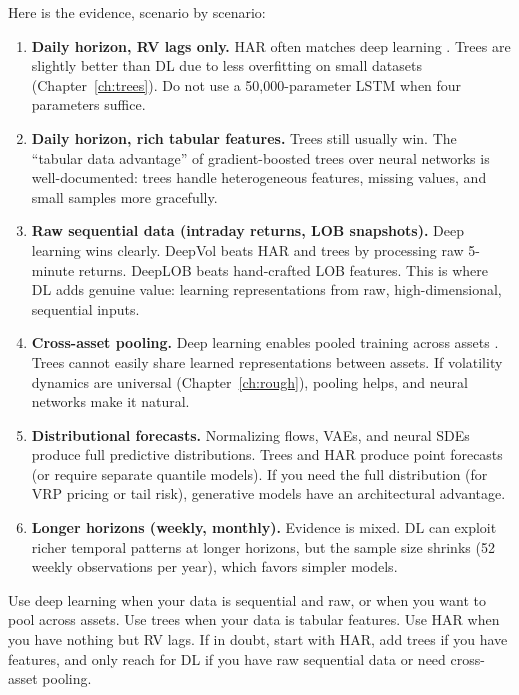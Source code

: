Here is the evidence, scenario by scenario:

\begin{enumerate}[nosep]
  \item \textbf{Daily horizon, RV lags only.}
    HAR often matches deep learning \citep{ChristensenSiggaardVeliyev2023}.
    Trees are slightly better than DL due to less overfitting on small datasets (Chapter~\ref{ch:trees}).
    Do not use a 50,000-parameter LSTM when four parameters suffice.

  \item \textbf{Daily horizon, rich tabular features.}
    Trees still usually win.
    The ``tabular data advantage'' of gradient-boosted trees over neural networks is well-documented: trees handle heterogeneous features, missing values, and small samples more gracefully.

  \item \textbf{Raw sequential data (intraday returns, LOB snapshots).}
    Deep learning wins clearly.
    DeepVol \citep{MorenoPinoZohren2022DeepVol} beats HAR and trees by processing raw 5-minute returns.
    DeepLOB \citep{ZhangZohrenRoberts2019DeepLOB} beats hand-crafted LOB features.
    This is where DL adds genuine value: learning representations from raw, high-dimensional, sequential inputs.

  \item \textbf{Cross-asset pooling.}
    Deep learning enables pooled training across assets \citep{SirignanoCont2019}.
    Trees cannot easily share learned representations between assets.
    If volatility dynamics are universal (Chapter~\ref{ch:rough}), pooling helps, and neural networks make it natural.

  \item \textbf{Distributional forecasts.}
    Normalizing flows, VAEs, and neural SDEs produce full predictive distributions.
    Trees and HAR produce point forecasts (or require separate quantile models).
    If you need the full distribution (for VRP pricing or tail risk), generative models have an architectural advantage.

  \item \textbf{Longer horizons (weekly, monthly).}
    Evidence is mixed.
    DL can exploit richer temporal patterns at longer horizons, but the sample size shrinks (52 weekly observations per year), which favors simpler models.
\end{enumerate}

\begin{keyidea}
Use deep learning when your data is sequential and raw, or when you want to pool across assets.
Use trees when your data is tabular features.
Use HAR when you have nothing but RV lags.
If in doubt, start with HAR, add trees if you have features, and only reach for DL if you have raw sequential data or need cross-asset pooling.
\end{keyidea}

